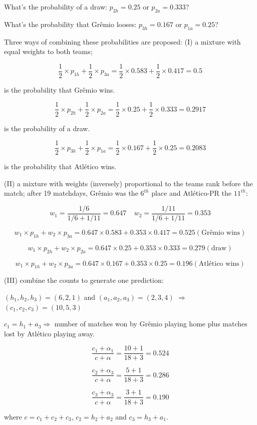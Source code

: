 \documentclass[journal,article,accept,moreauthors,pdftex,12pt,a4paper]{mdpi}
\begin{document}
What's the probability of a draw: $p_{2h}=0.25$ or $p_{2a}=0.333$?

What's the probability that Gr\^emio looses: $p_{3h}=0.167$ or $p_{1a}=0.25$?


Three ways of combining these probabilities are proposed: (I) a mixture with equal weights to both teams; 

\[
\frac{1}{2}\times p_{1h}+\frac{1}{2}\times p_{3a}=\frac{1}{2}\times0.583+\frac{1}{2}\times0.417=0.5
\]

\noindent
is the probability that Gr\^emio wins.


\[
\frac{1}{2}\times p_{2h}+\frac{1}{2}\times p_{2a}=\frac{1}{2}\times0.25+\frac{1}{2}\times0.333=0.2917
\]

\noindent
is the probability of a draw.

\[
\frac{1}{2}\times p_{3h}+\frac{1}{2}\times p_{1a}=\frac{1}{2}\times0.167+\frac{1}{2}\times0.25=0.2083
\]

\noindent
is the probability that Atl\'etico wins.


(II) a mixture with weights (inversely) proportional to the teams rank before the match; 
after 19 matchdays, Gr\^emio was the $6^{th}$ place and Atl\'etico-PR the $11^{th}$:


\[w_1 = \frac{1/6}{1/6+1/11}=0.647 ~ ~ ~ ~ ~ w_2 = \frac{1/11}{1/6+1/11}=0.353\]


\[
w_1\times p_{1h}+w_2\times p_{3a}=0.647\times0.583+0.353\times0.417=0.525 (\text{Gr\^emio wins})
\]

\[
w_1\times p_{2h}+w_2\times p_{2a}=0.647\times0.25+0.353\times0.333=0.279 (\text{draw})
\]

\[
w_1\times p_{1h}+w_2\times p_{3a}=0.647\times0.167+0.353\times0.25=0.196 (\text{Atl\'etico wins})
\]
    

(III) combine the counts to generate one prediction: 

$(h_1,h_2,h_3)=(6,2,1)$ and $(a_1,a_2,a_3)=(2,3,4)$ $\Rightarrow$ $(c_1,c_2,c_3)=(10,5,3)$


$c_1=h_1+a_3 \Rightarrow$ number of matches won by Gr\^emio playing home plus matches lost by Atl\'etico playing away.

\[\frac{c_1+\alpha_1}{c+\alpha}=\frac{10+1}{18+3}=0.524
\] 


\[\frac{c_2+\alpha_3}{c+\alpha}=\frac{5+1}{18+3}=0.286
\] 

\[\frac{c_3+\alpha_3}{c+\alpha}=\frac{3+1}{18+3}=0.190
\] 

\noindent
where $c=c_1+c_2+c_3$, $c_2=h_2+a_2$ and $c_3=h_3+a_1$.
\end{document}
